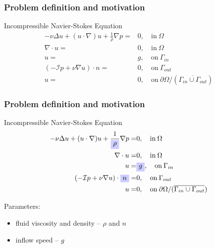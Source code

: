 \documentclass[18pt]{beamer}
\begin{document}
\begin{frame}[t]
  \frametitle{Problem definition and motivation}
  \begin{block}{Incompressible Navier-Stokes Equation}
  \begin{align*}
          -\nu\Delta u + (u\cdot\nabla)u + \frac{1}{\rho}\nabla p =& 0,  \quad\text{in}\: \Omega\\
          \nabla\cdot u =& 0, \quad\text{in}\: \Omega \\
          u =& g, \quad\text{on}\: \Gamma_{in} \\
          (-\mathcal{I}p + \nu\nabla u)\cdot n =& 0, \quad\text{on}\: \Gamma_{out} \\
          u =& 0, \quad\text{on}\:  \partial\Omega\slash (\overline{\Gamma_{in}\cup\Gamma_{out}})
  \end{align*}
  \end{block}
  \vspace*{1.5cm}
\end{frame}

\begin{frame}[t]
  \frametitle{Problem definition and motivation}
  \vspace*{-0.5cm}
  \begin{block}{Incompressible Navier-Stokes Equation}
  \begin{align*}
           -\nu\Delta u + (u\cdot\nabla)u + \frac{1}{\tikz[baseline]{
            \node[fill=blue!20,anchor=base] (t1)
            {$\rho$};}}\nabla p =& 0,  \quad\text{in}\: \Omega\\
          \nabla\cdot u =& 0, \quad\text{in}\: \Omega \\
          u =& \tikz[baseline]{
            \node[fill=blue!20,anchor=base] (t1)
            {$g$};}, \quad\text{on}\: \Gamma_{in} \\
          (-\mathcal{I}p + \nu\nabla u)\cdot \tikz[baseline]{
            \node[fill=blue!20,anchor=base] (t1)
            {$n$};} =& 0, \quad\text{on}\: \Gamma_{out} \\
          u =& 0, \quad\text{on}\:  \partial\Omega\slash (\overline{\Gamma_{in}\cup\Gamma_{out}})
  \end{align*}
\end{block}
Parameters:
\begin{itemize}
\item fluid viscosity and density -- $\rho$ and $n$
\item inflow speed -- $g$
\end{itemize}
\end{frame}
\end{document}
